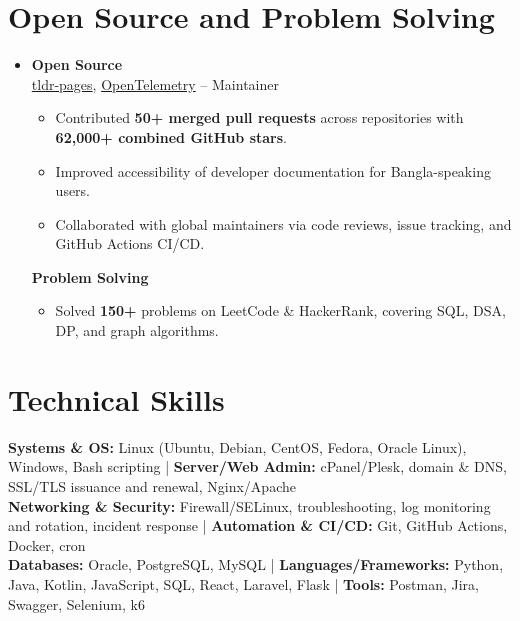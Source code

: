 \documentclass[a4paper]{article}
\newcommand{\subheading}[1]{\noindent \textbf{#1} \\}
\begin{document}
\section{Open Source and Problem Solving}
\begin{itemize}[leftmargin=0.15in, label={}, parsep=0pt]
\item
\small
\subheading{Open Source}
\href{https://github.com/tldr-pages/tldr}{tldr-pages}, \href{https://github.com/open-telemetry}{OpenTelemetry} --
Maintainer
\begin{itemize}[noitemsep, topsep=0pt]
    \item Contributed \textbf{50+ merged pull requests} across repositories with \textbf{62,000+ combined GitHub stars}.
    \item Improved accessibility of developer documentation for Bangla-speaking users.
    \item Collaborated with global maintainers via code reviews, issue tracking, and GitHub Actions CI/CD.
\end{itemize}

\vspace{0.5em}

\subheading{Problem Solving}
\begin{itemize}[noitemsep, topsep=0pt, partopsep=0pt]
\item Solved \textbf{150+} problems on LeetCode \& HackerRank, covering SQL, DSA, DP, and graph algorithms.
\end{itemize}
\end{itemize}




\section{Technical Skills}
\begin{itemize}[leftmargin=0.15in, label={}]
\small{\item{
\textbf{Systems \& OS:} Linux (Ubuntu, Debian, CentOS, Fedora, Oracle Linux), Windows, Bash scripting \;|\;
\textbf{Server/Web Admin:} cPanel/Plesk, domain \& DNS, SSL/TLS issuance and renewal, Nginx/Apache\\
\textbf{Networking \& Security:} Firewall/SELinux, troubleshooting, log monitoring and rotation, incident response \;|\;
\textbf{Automation \& CI/CD:} Git, GitHub Actions, Docker, cron\\
\textbf{Databases:} Oracle, PostgreSQL, MySQL \;|\;
\textbf{Languages/Frameworks:} Python, Java, Kotlin, JavaScript, SQL, React, Laravel, Flask \;|\;
\textbf{Tools:} Postman, Jira, Swagger, Selenium, k6
}}
\end{itemize}
\end{document}
